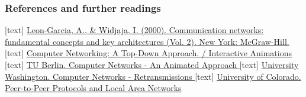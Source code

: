 \begin{frame}
	\frametitle{References and further readings}
	
	\begin{thebibliography}{9}
		
		  \href{https://www.ibr.cs.tu-bs.de/courses/ws0809/pcn/Documents/Communication_Networks-Fundamentals_Concepts_and_Key_Architectures.pdf}{Leon-Garcia, A., \& Widjaja, I. (2000). Communication networks: fundamental concepts and key architectures (Vol. 2). New York: McGraw-Hill.}
		  \href{https://wps.pearsoned.com/ecs_kurose_compnetw_6/216/55463/14198702.cw/index.html}{Computer Networking: A Top-Down Approach. / Interactive Animations }
		  \href{https://www2.tkn.tu-berlin.de/teaching/rn/animations/}{TU Berlin. Computer Networks - An Animated Approach }
		  \href{https://youtu.be/7C7wFMkcWrE}{University Washington. Computer Networks - Retransmissions }
		  \href{https://www.coursera.org/learn/peer-to-peer-protocols-local-area-networks}{University of Colorado. Peer-to-Peer Protocols and Local Area Networks}
		
		
		
	
	
	\end{thebibliography}

\end{frame}
